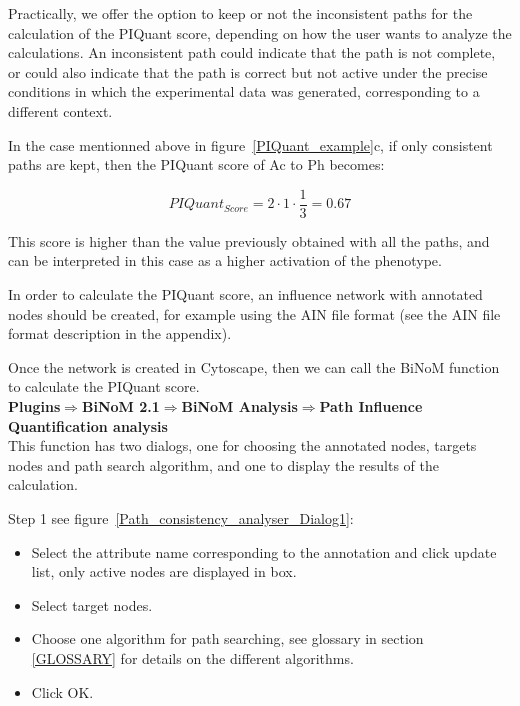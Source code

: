 Practically, we offer the option to
keep or not the inconsistent paths for the calculation of the PIQuant score,
depending on how the user wants to analyze the calculations. An inconsistent
path could indicate that the path is not complete, or could also indicate that
the path is correct but not active under the precise conditions in which the
experimental data was generated, corresponding to a different context.

In the case mentionned above in figure~\ref{PIQuant_example}c, if only consistent paths are kept, then the PIQuant score of Ac to Ph
becomes:

$$
 PIQuant_{Score} = 2 \cdot 1 \cdot \frac{1}{3} = 0.67
$$

This score is higher than the value previously obtained with all the paths, and can be interpreted in this case as a higher activation of the phenotype.


In order to calculate the PIQuant score, an influence network with annotated
nodes should be created, for example using the AIN file format (see the AIN file
format description in the appendix).

Once the network is created in Cytoscape, then we can call the BiNoM function to calculate the PIQuant score.\\

\textbf{Plugins$\Rightarrow$BiNoM 2.1$\Rightarrow$BiNoM Analysis$\Rightarrow$Path Influence Quantification analysis}\\


This function has two dialogs, one for choosing the annotated nodes, targets nodes and path search algorithm, and one to display the results of the calculation.

Step 1 see figure~\ref{Path_consistency_analyser_Dialog1}:

\begin{itemize}
  \item Select the attribute name corresponding to the annotation and click update list, only active nodes are
  displayed in box.
  \item Select target nodes.
  \item Choose one algorithm for path searching, see glossary in section \ref{GLOSSARY} for details on the different algorithms.
  \item Click OK.
\end{itemize}

